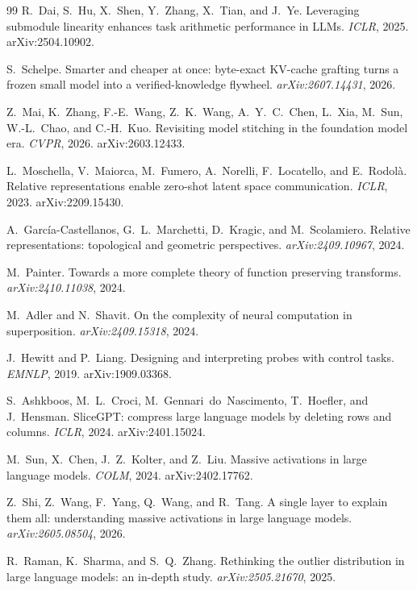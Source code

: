 \documentclass[11pt]{article}
\begin{document}
\begin{thebibliography}{99}
R.~Dai, S.~Hu, X.~Shen, Y.~Zhang, X.~Tian, and J.~Ye.
Leveraging submodule linearity enhances task arithmetic
performance in LLMs.
\emph{ICLR}, 2025. arXiv:2504.10902.

S.~Schelpe.
Smarter and cheaper at once: byte-exact KV-cache grafting turns a
frozen small model into a verified-knowledge flywheel.
\emph{arXiv:2607.14431}, 2026.

Z.~Mai, K.~Zhang, F.-E.~Wang, Z.~K.~Wang, A.~Y.~C.~Chen, L.~Xia,
M.~Sun, W.-L.~Chao, and C.-H.~Kuo.
Revisiting model stitching in the foundation model era.
\emph{CVPR}, 2026. arXiv:2603.12433.

L.~Moschella, V.~Maiorca, M.~Fumero, A.~Norelli, F.~Locatello, and
E.~Rodol\`a.
Relative representations enable zero-shot latent space
communication.
\emph{ICLR}, 2023. arXiv:2209.15430.

A.~Garc\'ia-Castellanos, G.~L.~Marchetti, D.~Kragic, and
M.~Scolamiero.
Relative representations: topological and geometric perspectives.
\emph{arXiv:2409.10967}, 2024.

M.~Painter.
Towards a more complete theory of function preserving transforms.
\emph{arXiv:2410.11038}, 2024.

M.~Adler and N.~Shavit.
On the complexity of neural computation in superposition.
\emph{arXiv:2409.15318}, 2024.

J.~Hewitt and P.~Liang.
Designing and interpreting probes with control tasks.
\emph{EMNLP}, 2019. arXiv:1909.03368.

S.~Ashkboos, M.~L.~Croci, M.~Gennari~do~Nascimento, T.~Hoefler,
and J.~Hensman.
SliceGPT: compress large language models by deleting rows and
columns.
\emph{ICLR}, 2024. arXiv:2401.15024.

M.~Sun, X.~Chen, J.~Z.~Kolter, and Z.~Liu.
Massive activations in large language models.
\emph{COLM}, 2024. arXiv:2402.17762.

Z.~Shi, Z.~Wang, F.~Yang, Q.~Wang, and R.~Tang.
A single layer to explain them all: understanding massive
activations in large language models.
\emph{arXiv:2605.08504}, 2026.

R.~Raman, K.~Sharma, and S.~Q.~Zhang.
Rethinking the outlier distribution in large language models: an
in-depth study.
\emph{arXiv:2505.21670}, 2025.


\end{thebibliography}
\end{document}
